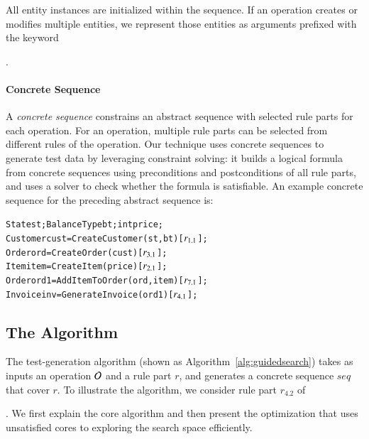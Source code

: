All entity instances are initialized within the sequence.  If an operation
creates or modifies multiple entities, we represent those entities as arguments
prefixed with the keyword \subject{out}.

\vskip -7pt
\paragraph*{Concrete Sequence} A \textit{concrete sequence} constrains an
abstract sequence with selected rule parts for each operation. For an operation,
multiple rule parts can be selected from different rules of the operation. Our
technique uses concrete sequences to generate test data by leveraging 
constraint solving: it builds a logical formula from concrete sequences using
preconditions and postconditions of all rule parts, and uses a solver to check
whether the formula is satisfiable. An example concrete sequence for the
preceding abstract sequence is:

\vspace*{-4pt}
{\scriptsize
\begin{alltt} 
 State st; BalanceType bt; int price;
 Customer cust = CreateCustomer(st, bt) [\(r\sb{1.1}\)];
 Order ord = CreateOrder(cust) [\(r\sb{3.1}\)];	
 Item item = CreateItem(price) [\(r\sb{2.1}\)];
 Order ord1 = AddItemToOrder(ord, item) [\(r\sb{7.1}\)];
 Invoice inv = GenerateInvoice(ord1) [\(r\sb{4.1}\)];  
\end{alltt}
}
\vspace*{-5pt}

\subsection{The Algorithm}
\label{sec:technique}

The test-generation algorithm (shown as Algorithm~\ref{alg:guidedsearch}) takes
as inputs an operation ${\cal O}$ and a rule part $r$, and generates a concrete
sequence $seq$ that cover $r$. To illustrate the algorithm, we consider rule
part $r_{4.2}$ of \subject{GenerateInvoice}.
We first explain the core algorithm and then present the optimization that uses
unsatisfied cores to exploring the search space efficiently.

